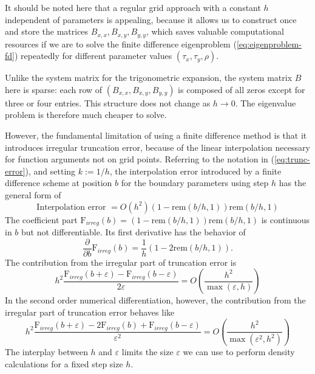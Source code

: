 It should be noted here that a regular grid approach with a constant
$h$ independent of parameters is appealing, because it allows us to
construct once and store the matrices $B_{x,x}, B_{x,y}, B_{y,y}$,
which saves valuable computational resources if we are to solve the
finite difference eigenproblem (\ref{eq:eigenproblem-fd}) repeatedly
for different parameter values $(\tau_x,\tau_y,\rho)$.

Unlike the system matrix for the trigonometric expansion, the system
matrix $B$ here is sparse: each row of $(B_{x,x}, B_{x,y}, B_{y,y})$
is composed of all zeros except for three or four entries. This
structure does not change as $h \to 0$. The eigenvalue problem is
therefore much cheaper to solve.

However, the fundamental limitation of using a finite difference
method is that it introduces irregular truncation error, because of
the linear interpolation necessary for function arguments not on grid
points. Referring to the notation in (\ref{eq:trunc-error}), and
setting $k := 1/h$, the interpolation error introduced by a finite
difference scheme at position $b$ for the boundary parameters using
step $h$ has the general form of
$$\mbox{Interpolation error } = O(h^2) (1-\mbox{rem}(b/h,1)) \mbox{rem}(b/h,1)$$ 
The coefficient part
$\mbox{F}_{irreg}(b) = (1-\mbox{rem}(b/h,1)) \mbox{rem}(b/h,1) $ is
continuous in $b$ but not differentiable. Its first derivative has the
behavior of
$$ \frac{\partial }{\partial b} \mbox{F}_{irreg}(b) =  \frac{1}{h} \left(1-2\mbox{rem}(b/h,1) \right).$$ The contribution from the irregular part of truncation error is 
$$ h^2 \frac{\mbox{F}_{irreg}(b+\varepsilon)-\mbox{F}_{irreg}(b-\varepsilon)}{2 \varepsilon}  = 
O\left(\frac{h^2}{\max(\varepsilon, h)} \right) $$ 
In the second order numerical differentiation, however, the contribution from 
the irregular part of truncation error behaves like 
$$ h^2 \frac{\mbox{F}_{irreg}(b+\varepsilon)-2\mbox{F}_{irreg}(b)
  +\mbox{F}_{irreg}(b-\varepsilon)}{\varepsilon^2 } =
O\left(\frac{h^2}{\max(\varepsilon^2, h^2)} \right) $$ The interplay
between $h$ and $\varepsilon$ limits the size $\varepsilon$ we can use
to perform density calculations for a fixed step size $h$.


